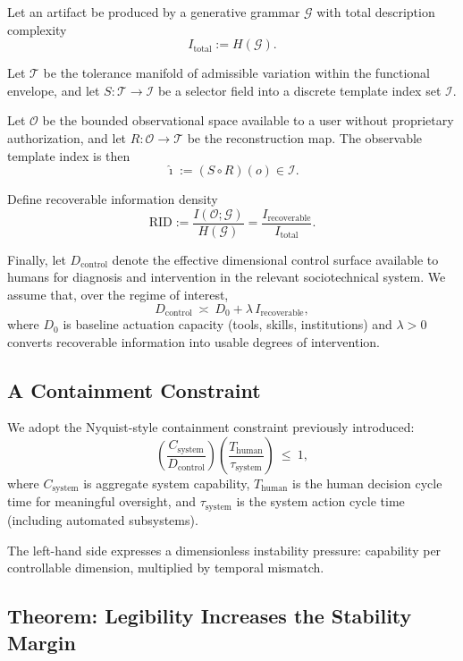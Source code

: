 \documentclass[11pt]{article}
\begin{document}
Let an artifact be produced by a generative grammar $\mathcal{G}$ with
total description complexity
\[
I_{\text{total}} := H(\mathcal{G}).
\]

Let $\mathcal{T}$ be the tolerance manifold of admissible variation
within the functional envelope, and let $S : \mathcal{T} \to \mathcal{I}$
be a selector field into a discrete template index set $\mathcal{I}$.

Let $\mathcal{O}$ be the bounded observational space available to a user
without proprietary authorization, and let $R:\mathcal{O}\to\mathcal{T}$
be the reconstruction map. The observable template index is then
\[
\widehat{\imath} := (S\circ R)(o)\in \mathcal{I}.
\]

Define recoverable information density
\[
\text{RID} := \frac{I(\mathcal{O};\mathcal{G})}{H(\mathcal{G})}
= \frac{I_{\text{recoverable}}}{I_{\text{total}}}.
\]

Finally, let $D_{\text{control}}$ denote the effective dimensional control
surface available to humans for diagnosis and intervention in the relevant
sociotechnical system. We assume that, over the regime of interest,
\[
D_{\text{control}} \ \asymp\  D_0 + \lambda\, I_{\text{recoverable}},
\]
where $D_0$ is baseline actuation capacity (tools, skills, institutions)
and $\lambda>0$ converts recoverable information into usable degrees of
intervention.

\subsection{A Containment Constraint}

We adopt the Nyquist-style containment constraint previously introduced:
\[
\left( \frac{C_{\text{system}}}{D_{\text{control}}} \right)
\left( \frac{T_{\text{human}}}{\tau_{\text{system}}} \right)\ \leq\ 1,
\]
where $C_{\text{system}}$ is aggregate system capability, $T_{\text{human}}$
is the human decision cycle time for meaningful oversight, and
$\tau_{\text{system}}$ is the system action cycle time (including automated
subsystems).

The left-hand side expresses a dimensionless instability pressure:
capability per controllable dimension, multiplied by temporal mismatch.

\subsection{Theorem: Legibility Increases the Stability Margin}
\end{document}
